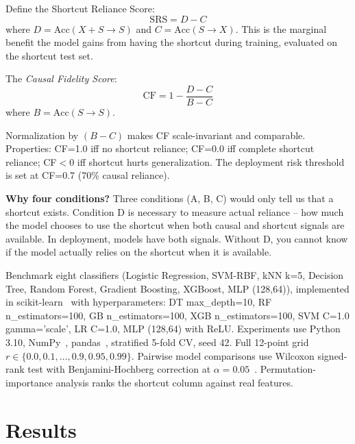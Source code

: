 \documentclass[conference]{IEEEtran}
\begin{document}
Define the Shortcut Reliance Score:
\begin{equation}
    \text{SRS} = D - C
\end{equation}
where $D = \text{Acc}(X+S \to S)$ and $C = \text{Acc}(S \to X)$. This is the marginal benefit the model gains from having the shortcut during training, evaluated on the shortcut test set.

The \textit{Causal Fidelity Score}:
\begin{equation}
    \text{CF} = 1 - \frac{D - C}{B - C}
    \label{eq:cf}
\end{equation}
where $B = \text{Acc}(S \to S)$.

Normalization by $(B-C)$ makes CF scale-invariant and comparable. Properties: CF=1.0 iff no shortcut reliance; CF=0.0 iff complete shortcut reliance; CF$<$0 iff shortcut hurts generalization. The deployment risk threshold is set at CF=0.7 (70\% causal reliance).

\textbf{Why four conditions?} Three conditions (A, B, C) would only tell us that a shortcut exists. Condition D is necessary to measure actual reliance -- how much the model chooses to use the shortcut when both causal and shortcut signals are available. In deployment, models have both signals. Without D, you cannot know if the model actually relies on the shortcut when it is available.

Benchmark eight classifiers (Logistic Regression, SVM-RBF, kNN k=5, Decision Tree, Random Forest, Gradient Boosting, XGBoost, MLP (128,64)), implemented in scikit-learn~\cite{sklearn} with hyperparameters: DT max\_depth=10, RF n\_estimators=100, GB n\_estimators=100, XGB n\_estimators=100, SVM C=1.0 gamma='scale', LR C=1.0, MLP (128,64) with ReLU. Experiments use Python 3.10, NumPy~\cite{numpy}, pandas~\cite{pandas}, stratified 5-fold CV, seed 42. Full 12-point grid $r \in \{0.0,0.1,\ldots,0.9,0.95,0.99\}$. Pairwise model comparisons use Wilcoxon signed-rank test with Benjamini-Hochberg correction at $\alpha=0.05$~\cite{powers2011evaluation}. Permutation-importance analysis ranks the shortcut column against real features.


\section{Results}
\label{sec:results}
\end{document}
